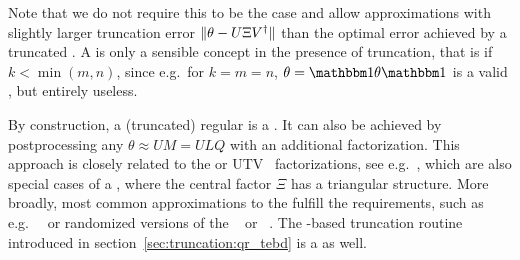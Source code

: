 Note that we do not require this to be the case and allow approximations with slightly larger truncation error $\norm{\theta - U \Xi \hconj{V}}$ than the optimal error achieved by a truncated .
%
A  is only a sensible concept in the presence of truncation, that is if $k < \min(m,n)$, since e.g.~for $k=m=n$, $\theta = \eye \theta \eye$ is a valid , but entirely useless.


By construction, a (truncated) regular  is a .
%
It can also be achieved by postprocessing any  $\theta \approx U M = U L Q$ with an additional  factorization.
%
This approach is closely related to the  or UTV~\cite{stewart1999} factorizations, see e.g.~\cite[§5.4.6]{golub2013}, which are also special cases of a , where the central factor $\Xi$ has a triangular structure.
%
More broadly, most common approximations to the  fulfill the requirements, such as e.g.~~\cite{voronin2016} or randomized versions of the ~\cite{duersch2017} or ~\cite{stewart1999, wu2020, kaloorazi2023}.
%
The -based truncation routine introduced in section~\ref{sec:truncation:qr_tebd} is a  as well.
